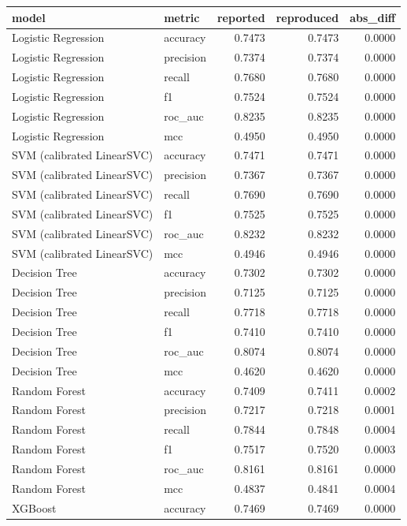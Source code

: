 \begin{tabular}{llrrr}
\toprule
model & metric & reported & reproduced & abs\_diff \\
\midrule
Logistic Regression & accuracy & 0.7473 & 0.7473 & 0.0000 \\
Logistic Regression & precision & 0.7374 & 0.7374 & 0.0000 \\
Logistic Regression & recall & 0.7680 & 0.7680 & 0.0000 \\
Logistic Regression & f1 & 0.7524 & 0.7524 & 0.0000 \\
Logistic Regression & roc\_auc & 0.8235 & 0.8235 & 0.0000 \\
Logistic Regression & mcc & 0.4950 & 0.4950 & 0.0000 \\
SVM (calibrated LinearSVC) & accuracy & 0.7471 & 0.7471 & 0.0000 \\
SVM (calibrated LinearSVC) & precision & 0.7367 & 0.7367 & 0.0000 \\
SVM (calibrated LinearSVC) & recall & 0.7690 & 0.7690 & 0.0000 \\
SVM (calibrated LinearSVC) & f1 & 0.7525 & 0.7525 & 0.0000 \\
SVM (calibrated LinearSVC) & roc\_auc & 0.8232 & 0.8232 & 0.0000 \\
SVM (calibrated LinearSVC) & mcc & 0.4946 & 0.4946 & 0.0000 \\
Decision Tree & accuracy & 0.7302 & 0.7302 & 0.0000 \\
Decision Tree & precision & 0.7125 & 0.7125 & 0.0000 \\
Decision Tree & recall & 0.7718 & 0.7718 & 0.0000 \\
Decision Tree & f1 & 0.7410 & 0.7410 & 0.0000 \\
Decision Tree & roc\_auc & 0.8074 & 0.8074 & 0.0000 \\
Decision Tree & mcc & 0.4620 & 0.4620 & 0.0000 \\
Random Forest & accuracy & 0.7409 & 0.7411 & 0.0002 \\
Random Forest & precision & 0.7217 & 0.7218 & 0.0001 \\
Random Forest & recall & 0.7844 & 0.7848 & 0.0004 \\
Random Forest & f1 & 0.7517 & 0.7520 & 0.0003 \\
Random Forest & roc\_auc & 0.8161 & 0.8161 & 0.0000 \\
Random Forest & mcc & 0.4837 & 0.4841 & 0.0004 \\
XGBoost & accuracy & 0.7469 & 0.7469 & 0.0000 \\

\end{tabular}
